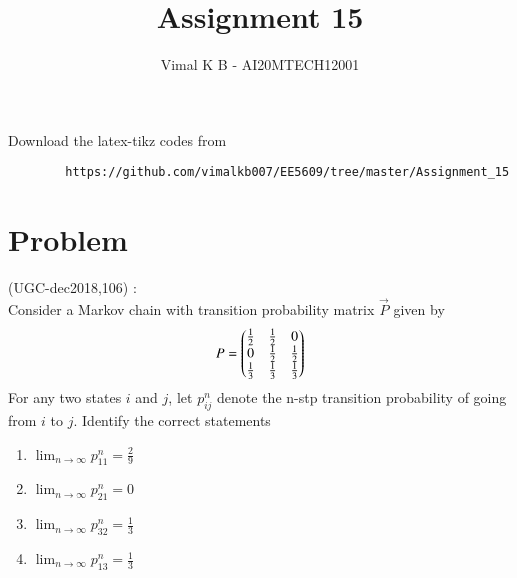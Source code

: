 \documentclass[journal,12pt]{IEEEtran}
\begin{document}
	\renewcommand{\thefigure}{\theproblem}
	\def\putbox#1#2#3{\makebox[0in][l]{\makebox[#1][l]{}\raisebox{\baselineskip}[0in][0in]{\raisebox{#2}[0in][0in]{#3}}}}
	\def\rightbox#1{\makebox[0in][r]{#1}}
	\def\centbox#1{\makebox[0in]{#1}}
	\def\topbox#1{\raisebox{-\baselineskip}[0in][0in]{#1}}
	\def\midbox#1{\raisebox{-0.5\baselineskip}[0in][0in]{#1}}
	\vspace{3cm}
	\title{Assignment 15}
	\author{Vimal K B - AI20MTECH12001}
	\maketitle
	\bigskip
	\renewcommand{\thefigure}{\theenumi}
	\renewcommand{\thetable}{\theenumi}
	Download the latex-tikz codes from 
	\begin{lstlisting}
		https://github.com/vimalkb007/EE5609/tree/master/Assignment_15
	\end{lstlisting}
	\section{\textbf{Problem}}
	(UGC-dec2018,106) : \\
	Consider a Markov chain with transition probability matrix $\vec{P}$ given by
	\begin{align}
		P=\begin{pmatrix}\frac{1}{2} & \frac{1}{2} & 0 \\
			0 & \frac{1}{2} & \frac{1}{2} \\
			\frac{1}{3} & \frac{1}{3} & \frac{1}{3}\end{pmatrix} \nonumber
	\end{align}
	For any two states $i$ and $j$, let $p^{n}_{ij}$ denote the n-stp transition probability of going from $i$ to $j$. Identify the correct statements
	\begin{enumerate}
		\item $\lim_{n \to \infty} p^{n}_{11} = \frac{2}{9}$
		\item $\lim_{n \to \infty} p^{n}_{21} = 0$
		\item $\lim_{n \to \infty} p^{n}_{32} = \frac{1}{3}$
		\item $\lim_{n \to \infty} p^{n}_{13} = \frac{1}{3}$
	\end{enumerate}
	
\end{document}
